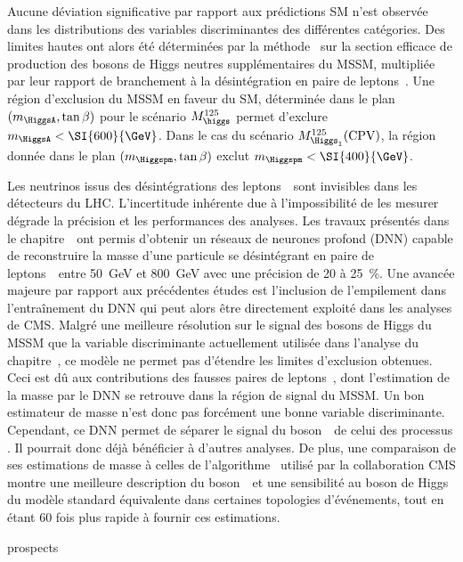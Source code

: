 Aucune déviation significative par rapport aux prédictions SM n'est observée
dans
les distributions des variables discriminantes des différentes catégories.
Des limites hautes ont alors été déterminées par la méthode \CLS\ sur la section efficace de production des bosons de Higgs neutres supplémentaires du MSSM, multipliée par leur rapport de branchement à la désintégration en paire de leptons~\tau.
Une région d'exclusion du MSSM en faveur du SM,
déterminée dans le plan $(m_{\HiggsA},\tan\beta)$ pour le scénario $M_{\higgs}^{125}$
permet d'exclure
$m_{\HiggsA} < \SI{600}{\GeV}$.
Dans le cas du scénario $M_{\Higgs_1}^{125}(\text{CPV})$,
la région donnée dans le plan $(m_{\Higgspm},\tan\beta)$
exclut
$m_{\Higgspm} < \SI{400}{\GeV}$.
\par
Les neutrinos issus des désintégrations des leptons~\tau\
sont invisibles dans les détecteurs du LHC.
L'incertitude inhérente due à l'impossibilité de les mesurer
dégrade la précision et les performances des analyses.
Les travaux présentés dans le chapitre~\
ont permis d'obtenir un réseaux de neurones profond (DNN)
capable de reconstruire la masse d'une particule se désintégrant en paire de leptons~\tau\
entre \SI{50}{\GeV} et \SI{800}{\GeV}
avec une précision de \num{20} à \SI{25}{\%}.
Une avancée majeure par rapport aux précédentes études est l'inclusion de l'empilement dans l'entraînement du DNN
qui peut alors être directement exploité dans les analyses de CMS.
Malgré une meilleure résolution sur le signal des bosons de Higgs du MSSM que la variable discriminante actuellement utilisée dans l'analyse du chapitre~,
ce modèle ne permet pas d'étendre les limites d'exclusion obtenues.
Ceci est dû aux contributions des fausses paires de leptons~\tau,
dont l'estimation de la masse par le DNN se retrouve dans la région de signal du MSSM.
Un bon estimateur de masse n'est donc pas forcément une bonne variable discriminante.
Cependant,
ce DNN permet de séparer le signal du boson~\Zboson\ de celui des processus \ttbar.
Il pourrait donc déjà bénéficier à d'autres analyses.
De plus,
une comparaison de ses estimations de masse à celles de l'algorithme \SVFIT\ utilisé par la collaboration CMS montre
une meilleure description du boson~\Zboson\ et une sensibilité au boson de Higgs du modèle standard
équivalente
dans certaines topologies d'événements,
tout en étant 60 fois plus rapide à fournir ces estimations.
\par

prospects
